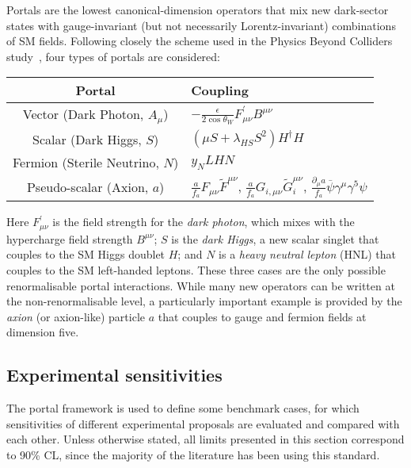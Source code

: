 \documentclass[../report.tex]{subfiles}
\begin{document}
Portals are the lowest canonical-dimension operators that mix new dark-sector states with gauge-invariant (but not necessarily Lorentz-invariant) combinations of SM fields. Following closely the scheme used in the Physics Beyond Colliders study~\cite{Beacham:2019nyx}, four types of portals are considered:
\begin{center}
\begin{tabular}{c|l}
Portal & Coupling \\
 \hline
Vector (Dark Photon, $A_{\mu}$) &  $-\frac{\epsilon}{2 \cos\theta_W} F^\prime_{\mu\nu} B^{\mu\nu}$ \\ 
Scalar (Dark Higgs, $S$) & $(\mu S + \lambda_{HS} S^2) H^{\dagger} H$  \\ 
Fermion (Sterile Neutrino, $N$) & $y_N L H N$ \\ 
Pseudo-scalar (Axion, $a$) &  $\frac{a}{f_a} F_{\mu\nu}  \tilde{F}^{\mu\nu}$, $\frac{a}{f_a} G_{i, \mu\nu}  \tilde{G}^{\mu\nu}_{i}$,
$\frac{\partial_{\mu} a}{f_a }\overline{\psi} \gamma^{\mu} \gamma^5 \psi$
\end{tabular}
\end{center}
Here $F^\prime_{\mu \nu}$ is the field strength for the {\it dark photon}, which mixes with the hypercharge field strength
$B^{\mu\nu}$; $S$ is the {\it dark Higgs}, a new scalar singlet that couples to the SM Higgs doublet
$H$;
and $N$ is a {\it heavy neutral lepton} (HNL)
that couples to the SM left-handed leptons. These three cases are the only possible renormalisable portal interactions. While many new operators can be written at the non-renormalisable level, a particularly important example is provided by the {\it axion} (or axion-like) particle $a$ that couples to gauge and fermion fields at dimension five.

\subsection{Experimental sensitivities}
\label{ssec:fips_sensitivities}
The portal framework is used to define some benchmark cases, for which sensitivities of different experimental proposals are evaluated and compared with each other. 
Unless otherwise stated, all limits presented in this section correspond to 90\% CL, since the majority of the literature has been using this standard.
\end{document}
